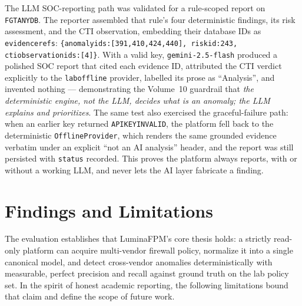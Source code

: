 \documentclass[12pt,a4paper]{report}
\renewcommand{\_}{\textunderscore\allowbreak}
\begin{document}
The LLM SOC-reporting path was validated for a rule-scoped report on \texttt{FGT\_ANY\_DB}. The reporter assembled that rule's four deterministic findings, its risk assessment, and the CTI observation, embedding their database IDs as \texttt{evidence\_refs}: \texttt{\{anomaly\_ids:[391,410,424,440], risk\_id:243, cti\_observation\_ids:[4]\}}. With a valid key, \texttt{gemini-2.5-flash} produced a polished SOC report that cited each evidence ID, attributed the CTI verdict explicitly to the \texttt{lab\_offline} provider, labelled its prose as ``Analysis'', and invented nothing --- demonstrating the Volume~10 guardrail that \emph{the deterministic engine, not the LLM, decides what is an anomaly; the LLM explains and prioritizes}. The same test also exercised the graceful-failure path: when an earlier key returned \texttt{API\_KEY\_INVALID}, the platform fell back to the deterministic \texttt{OfflineProvider}, which renders the same grounded evidence verbatim under an explicit ``not an AI analysis'' header, and the report was still persisted with \texttt{status} recorded. This proves the platform always reports, with or without a working LLM, and never lets the AI layer fabricate a finding.

\section{Findings and Limitations}
\label{sec:ch4-findings}

The evaluation establishes that LuminaFPM's core thesis holds: a strictly read-only platform can acquire multi-vendor firewall policy, normalize it into a single canonical model, and detect cross-vendor anomalies deterministically with measurable, perfect precision and recall against ground truth on the lab policy set. In the spirit of honest academic reporting, the following limitations bound that claim and define the scope of future work.
\end{document}
